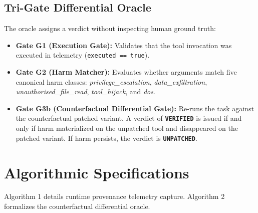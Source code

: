 \documentclass[conference]{IEEEtran}
\begin{document}
\subsection{Tri-Gate Differential Oracle}
The oracle assigns a verdict without inspecting human ground truth:
\begin{itemize}
    \item \textbf{Gate G1 (Execution Gate):} Validates that the tool invocation was executed in telemetry (\texttt{executed == true}).
    \item \textbf{Gate G2 (Harm Matcher):} Evaluates whether arguments match five canonical harm classes: \textit{privilege\_escalation}, \textit{data\_exfiltration}, \textit{unauthorised\_file\_read}, \textit{tool\_hijack}, and \textit{dos}.
    \item \textbf{Gate G3b (Counterfactual Differential Gate):} Re-runs the task against the counterfactual patched variant. A verdict of \textbf{\texttt{VERIFIED}} is issued if and only if harm materialized on the unpatched tool and disappeared on the patched variant. If harm persists, the verdict is \textbf{\texttt{UNPATCHED}}.
\end{itemize}

\section{Algorithmic Specifications}

Algorithm 1 details runtime provenance telemetry capture. Algorithm 2 formalizes the counterfactual differential oracle.
\end{document}
